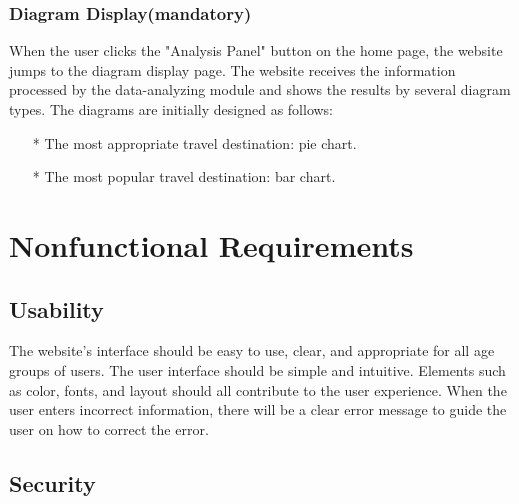 \documentclass[conference]{IEEEtran}
\begin{document}
\subsubsection{ Diagram Display(mandatory) }

When the user clicks the "Analysis Panel" button on the home page, the website jumps to the diagram display page.
The website receives the information processed by the data-analyzing module and shows the results by several diagram types. 
The diagrams are initially designed as follows:

\begin{itemize}
\item[*] The most appropriate travel destination: pie chart.

\item[*] The most popular travel destination: bar chart.
\end{itemize}






\section{Nonfunctional Requirements}

\subsection{ Usability }

The website's interface should be easy to use, clear, and appropriate for all 
age groups of users. The user interface should be simple and intuitive. Elements 
such as color, fonts, and layout should all contribute to the user experience.
When the user enters incorrect information, there will be a clear error message 
to guide the user on how to correct the error.

\subsection{ Security }
\end{document}
